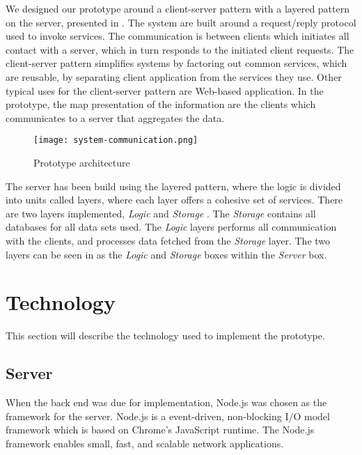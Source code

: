 We designed our prototype around a client-server pattern \cite[pp. 217-219]{Bass:2012:SAP:2392670} with a layered
pattern \cite[pp. 205-210]{Bass:2012:SAP:2392670} on the server, presented in . The 
system are built around a request/reply protocol used to invoke services. The
communication is between clients which initiates all contact with 
a server, which in turn responds to the initiated client requests. The
client-server pattern simplifies systems by factoring out common services,
which are reusable, by separating client application from the services they
use. Other typical uses for the client-server pattern are Web-based
application. In the prototype, the map presentation of the information are the 
clients which communicates to a server that aggregates the data. \\

\begin{figure}[!htbp]
	\texttt{[image: system-communication.png]}
	\caption[Prototype architecture]{Prototype architecture}
	\label{fig:prototype_architecture}
\end{figure}


The server has been build using the layered pattern, where the logic is 
divided into units called layers, where each layer offers a cohesive set of 
services. There are two layers implemented, \textit{Logic} and \textit{Storage}
. The \textit{Storage} contains all databases for all data sets used. The 
\textit{Logic} layers performs all communication with the clients, and 
processes data fetched from the \textit{Storage} layer. The two layers can be 
seen in  as the \textit{Logic} and 
\textit{Storage} boxes within the \textit{Server} box.




\section{Technology} %
This section will describe the technology used to implement the prototype.
\label{sec:technology}

\subsection{Server} %
\label{sub:server}
When the back end was due for implementation, Node.js\cite{nodeJs} was chosen 
as the framework for the server. Node.js is a event-driven, non-blocking  I/O
model framework which is based on Chrome's\cite{chromeJavaScriptEngine} 
JavaScript runtime. The Node.js framework enables small, fast, and scalable 
network applications.

